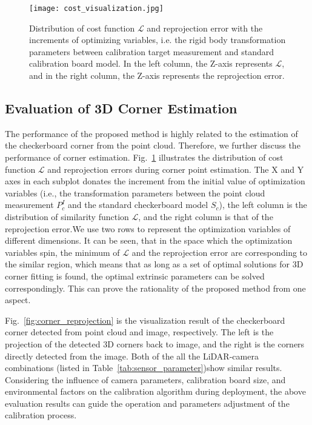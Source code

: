 \documentclass[journal]{vgtc}
\begin{document}
\begin{figure}[!htb]
	\centering
	\texttt{[image: cost\_visualization.jpg]} 
	\caption{Distribution of cost function $\mathcal{L}$ and reprojection error with the increments of optimizing variables, i.e. the rigid body transformation parameters between calibration target measurement and standard calibration board model. In the left column, the Z-axis represents $\mathcal{L}$, and in the right column, the Z-axis represents the reprojection error.}
	\label{fig:cost} 
	
\end{figure}






\subsection{Evaluation of 3D Corner Estimation}

The performance of the proposed method is highly related to the estimation of the checkerboard corner from the point cloud. Therefore, we further discuss the performance of corner estimation. Fig.~\ref{fig:cost} illustrates the distribution of cost function $\mathcal{L}$ and reprojection errors during corner point estimation. The X and Y axes in each subplot donates the increment from the initial value of optimization variables (i.e., the transformation parameters between the point cloud measurement $P^I_c$ and the standard checkerboard model $S_c$), the left column is the distribution of similarity function $\mathcal{L}$, and the right column is that of the reprojection error.We use two rows to represent the optimization variables of different dimensions. It can be seen, that in the space which the optimization variables spin, the minimum of $\mathcal{L}$ and the reprojection error are corresponding to the similar region, which means that as long as a set of optimal solutions for 3D corner fitting is found, the optimal extrinsic parameters can be solved correspondingly. This can prove the rationality of the proposed method from one aspect.

Fig.~\ref{fig:corner_reprojection} is the visualization result of the checkerboard corner detected from point cloud and image, respectively. The left is the projection of the detected 3D corners back to image, and the right is the corners directly detected from the image. Both of the all the LiDAR-camera combinations (listed in Table~\ref{tab:sensor_parameter})show similar results. Considering the influence of camera parameters, calibration board size, and environmental factors on the calibration algorithm during deployment, the above evaluation results can guide the operation and parameters adjustment of the calibration process.
\end{document}
